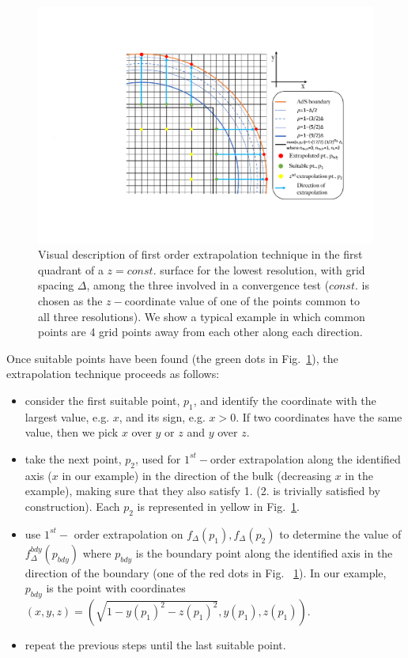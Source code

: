\documentclass[a4paper,11pt]{article}
\begin{document}
\begin{figure}[h]
        \centering
        \includegraphics[width=5.0in,clip=true]{plots/lego_circle/Lego_circle_new.pdf}
\parbox{5.0in}{\caption{Visual description of first order extrapolation technique in the first quadrant of a $z=const.$ surface for the lowest resolution, with grid spacing $\Delta$, among the three involved in a convergence test ($const.$ is chosen as the $z-$coordinate value of one of the points common to all three resolutions). We show a typical example in which common points are 4 grid points away from each other along each direction.
        }\label{fig:lego_circle}}
\end{figure}
 
Once suitable points have been found (the green dots in Fig.~\ref{fig:lego_circle}), the extrapolation technique proceeds as follows:
 \begin{itemize}
 \item consider the first suitable point, $p_1$, and identify the coordinate with the largest value, e.g. $x$, and its sign, e.g. $x>0$. If two coordinates have the same value, then we pick $x$ over $y$ or $z$ and $y$ over $z$.
 \item take the next point, $p_2$, used for $1^{st}-$order extrapolation along the identified axis ($x$ in our example) in the direction of the bulk (decreasing $x$ in the example), making sure that they also satisfy 1. (2. is trivially satisfied by construction). Each $p_2$ is represented in yellow in Fig.~\ref{fig:lego_circle}.
 \item use $1^{st}-$ order extrapolation on $f_\Delta(p_1),f_\Delta(p_{2})$ to determine the value of $f^{bdy}_{\Delta}(p_{bdy})$ where $p_{bdy}$ is the boundary point along the identified axis in the direction of the boundary (one of the red dots in Fig. ~\ref{fig:lego_circle}). In our example, $p_{bdy}$ is the point with coordinates $(x,y,z)=(\sqrt{1-y(p_1)^2-z(p_1)^2},y(p_1),z(p_1))$.
 \item repeat the previous steps until the last suitable point.
 \end{itemize}
\end{document}
